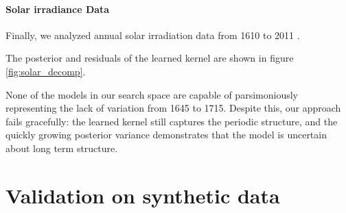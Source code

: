 \documentclass[twoside]{article}
\renewcommand{\TBD}[1]{}
\renewcommand{\fTBD}[1]{}
\begin{document}
\paragraph{Solar irradiance Data} 
Finally, we analyzed annual solar irradiation data from 1610 to 2011 \citep{lean1995reconstruction}.
%

%
The posterior and residuals of the learned kernel are shown in figure \ref{fig:solar_decomp}.

%
None of the models in our search space are capable of parsimoniously representing the lack of variation from 1645 to 1715. %
%
%
Despite this, our approach fails gracefully: the learned kernel still captures the periodic structure, and the quickly growing posterior variance demonstrates that the model is uncertain about long term structure.











\section{Validation on synthetic data}
\label{sec:synthetic}


\end{document}
